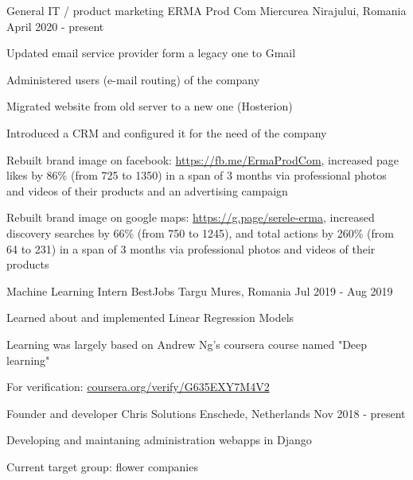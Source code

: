 
    \begin{cventries}
    
    \cventry
    {General IT / product marketing}
    {ERMA Prod Com}
    {Miercurea Nirajului, Romania}
    {April 2020 - present}
    {
        \begin{cvitems}
            \item {Updated email service provider form a legacy one to Gmail}
            \item {Administered users (e-mail routing) of the company}
            \item {Migrated website from old server to a new one (Hosterion)}
            \item {Introduced a CRM and configured it for the need of the company}
            \item {Rebuilt brand image on facebook: \url{https://fb.me/ErmaProdCom}, increased page likes by 86\%  (from 725 to 1350) in a span of 3 months via professional photos and videos of their products and an advertising campaign}
            \item {Rebuilt brand image on google maps: \url{https://g.page/serele-erma}, increased discovery searches by 66\% (from 750 to 1245), and total actions by 260\%  (from 64 to 231) in a span of 3 months via professional photos and videos of their products}
        \end{cvitems}
    }
    
    \cventry
    {Machine Learning Intern}
    {BestJobs}
    {Targu Mures, Romania}
    {Jul 2019 - Aug 2019}
    {
        \begin{cvitems}
        \item {Learned about and implemented Linear Regression Models}
        \item {Learning was largely based on Andrew Ng's coursera course named "Deep learning"}
        \item {For verification: \url{coursera.org/verify/G635EXY7M4V2}}
        \end{cvitems}
    }

    \cventry
    {Founder and developer}
    {Chris Solutions}
    {Enschede, Netherlands}
    {Nov 2018 - present}
    {
        \begin{cvitems}
            \item {Developing and maintaning administration webapps in Django}
            \item {Current target group: flower companies}
        \end{cvitems}
    }


\end{cventries}
